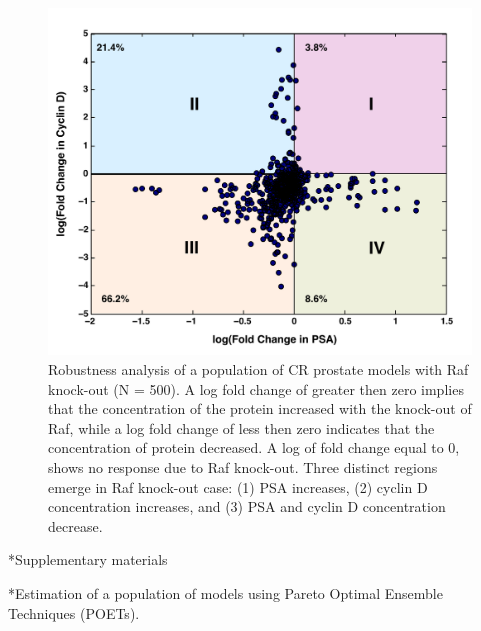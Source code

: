 \documentclass[12pt]{article}
\makeatletter
\renewcommand\subsection{\@startsection
	{subsection}{2}{0mm}
	{-0.05in}
	{-0.5\baselineskip}
	{\normalfont\normalsize\bfseries}}
\renewcommand\section{\@startsection
	{subsection}{2}{0mm}
	{-0.2in}
	{0.05\baselineskip}
	{\normalfont\large\bfseries}}
\makeatother
\begin{document}
\begin{figure}\centering
\includegraphics[width=1.0\textwidth]{./figs/Figure6_RAF_K0_C81.pdf}
\caption{Robustness analysis of a population of CR prostate models with Raf knock-out (N = 500). A log fold change of greater then zero implies that the concentration of the protein increased with the knock-out of Raf, while a log fold change of less then zero indicates that the concentration of protein decreased. A log of fold change equal to 0, shows no response due to Raf knock-out. Three distinct regions emerge in Raf knock-out case: (1) PSA increases, (2) cyclin D concentration increases, and (3) PSA and cyclin D concentration decrease. }
\label{fg:Robustness}
\end{figure}

\clearpage

\renewcommand\thefigure{S\arabic{figure}}
\renewcommand\thetable{T\arabic{table}}
\renewcommand\thepage{S-\arabic{page}}
\renewcommand\theequation{S\arabic{equation}}

\setcounter{equation}{0}
\setcounter{table}{0}
\setcounter{figure}{0}
\setcounter{page}{1}

\section*{Supplementary materials}

\subsection*{Estimation of a population of models using Pareto Optimal Ensemble Techniques (POETs).}
\end{document}

